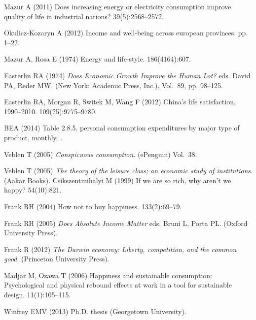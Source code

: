 \documentclass[10pt, letterpaper]{article}
\begin{document}
\begin{spacing}{1.4}
\begin{thebibliography}{10}
Mazur A (2011) Does increasing energy or electricity consumption improve
  quality of life in industrial nations?
 39(5):2568--2572.

Okulicz-Kozaryn A (2012) Income and well-being across european provinces.
 pp. 1--22.

Mazur A, Rosa E (1974) Energy and life-style.
 186(4164):607.

Easterlin RA (1974) {\em Does Economic Growth Improve the Human Lot?} eds.{}
  David PA, Reder MW.
\newblock (New York: Academic Press, Inc.), Vol.{}~89, pp. 98--125.

Easterlin RA, Morgan R, Switek M, Wang F (2012) China's life satisfaction,
  1990--2010.
  109(25):9775--9780.

BEA (2014) Table 2.8.5. personal consumption expenditures by major type of
  product, monthly.
.

Veblen T (2005) {\em Conspicuous consumption}.
\newblock (ePenguin) Vol.{}~38.

Veblen T (2005) {\em The theory of the leisure class; an economic study of
  institutions}.
\newblock (Aakar Books).
Csikszentmihalyi M (1999) If we are so rich, why aren't we happy?
 54(10):821.

Frank RH (2004) How not to buy happiness.
 133(2):69--79.

Frank RH (2005) {\em Does Absolute Income Matter} eds.{} Bruni L, Porta PL.
\newblock (Oxford University Press).

Frank R (2012) {\em The Darwin economy: Liberty, competition, and the common
  good}.
\newblock (Princeton University Press).

Madjar M, Ozawa T (2006) Happiness and sustainable consumption: Psychological
  and physical rebound effects at work in a tool for sustainable design.
  11(1):105--115.

Winfrey EMV (2013) Ph.D. thesis (Georgetown University).


\end{thebibliography}
\end{spacing}
\end{document}

